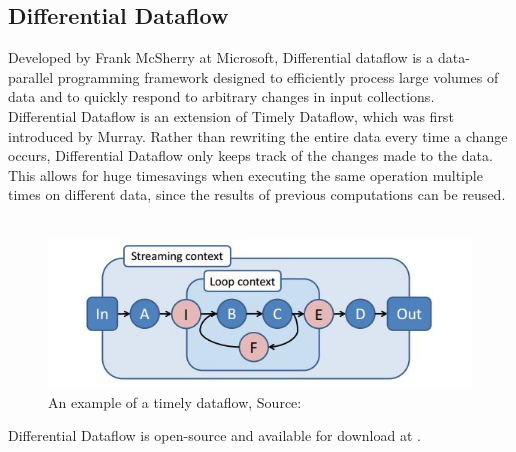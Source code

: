 \documentclass[11pt,singlecolumn]{scrartcl}
\begin{document}
\subsection{Differential Dataflow}

Developed by Frank McSherry at Microsoft, Differential dataflow is a data-parallel programming framework designed to efficiently process large volumes of data and to quickly respond to arbitrary changes in input collections.\cite{Differential}\\
Differential Dataflow is an extension of Timely Dataflow, which was first introduced by Murray. \cite{GitTimely}
Rather than rewriting the entire data every time a change occurs, Differential Dataflow only keeps track of the changes made to the data. This allows for huge timesavings when executing the same operation multiple times on different data, since the results of previous computations can be reused.\\\\
\begin{figure}[H]
\includegraphics[width=1\textwidth]{dataflow_example}
\caption[Timely Dataflow Example]{An example of a timely dataflow, Source:\protect\cite{Naiad}}
\end{figure}
Differential Dataflow is open-source and available for download at \cite{GitDiff}.
\end{document}
